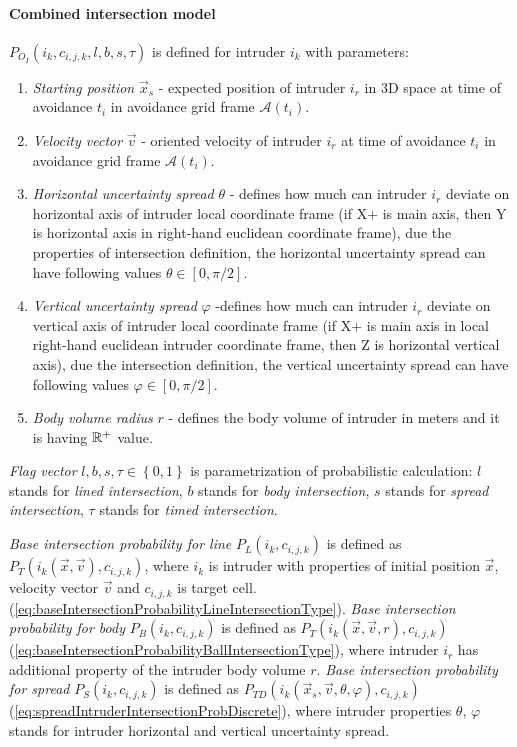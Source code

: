 \paragraph{Combined intersection model} $P_{O_I}(i_k,c_{i,j,k},l,b,s,\tau)$ is defined for intruder $i_k$ with parameters:
\begin{enumerate}
    \item\textit{Starting position} $\vec{x}_s$ - expected position of intruder $i_r$ in 3D space at time of avoidance $t_i$ in avoidance grid frame $\mathscr{A}(t_i)$.
    \item\textit{Velocity vector} $\vec{v}$ - oriented velocity of intruder $i_r$ at time of avoidance $t_i$ in avoidance grid frame $\mathscr{A}(t_i)$. 
    \item\textit{Horizontal uncertainty spread} $\theta$ - defines how much can intruder $i_r$ deviate on horizontal axis of intruder local coordinate frame (if X+ is main axis, then Y is horizontal axis in right-hand euclidean coordinate frame), due the properties of intersection definition, the horizontal uncertainty spread can have following values $\theta\in[0,\pi/2]$.
    \item\textit{Vertical uncertainty spread} $\varphi$ -defines how much can intruder $i_r$ deviate on vertical axis of intruder local coordinate frame (if X+ is main axis in local right-hand euclidean intruder coordinate frame, then Z is horizontal vertical axis), due the intersection definition, the vertical uncertainty spread can have following values $\varphi\in[0,\pi/2]$.
    \item\textit{Body volume radius} $r$ - defines the body volume of intruder in meters and it is having  $\mathbb{R}^+$  value.
\end{enumerate}
\noindent \emph{Flag vector} $l,b,s,\tau \in \left\{0,1\right\}$ is parametrization of probabilistic calculation: $l$ stands for \emph{lined intersection}, $b$ stands for \emph{body intersection}, $s$ stands for \emph{spread intersection}, $\tau$ stands for \emph{timed intersection}. 

\emph{Base intersection probability for line} $P_L(i_k,c_{i,j,k})$ is defined as $P_T(i_k(\vec{x},\vec{v}),c_{i,j,k})$, where $i_k$ is intruder with properties of initial position $\vec{x}$, velocity vector $\vec{v}$ and $c_{i,j,k}$ is target cell. (\ref{eq:baseIntersectionProbabilityLineIntersectionType}). \emph{Base intersection probability for body} $P_B(i_k,c_{i,j,k})$ is defined as $P_T(i_k(\vec{x},\vec{v},r),c_{i,j,k})$ (\ref{eq:baseIntersectionProbabilityBallIntersectionType}), where intruder $i_r$ has additional property of the intruder body volume $r$. \emph{Base intersection probability for spread} $P_S(i_k,c_{i,j,k})$ is defined as $P_{TD}(i_k(\vec{x}_s,\vec{v},\theta,\varphi),c_{i,j,k})$ (\ref{eq:spreadIntruderIntersectionProbDiscrete}), where intruder properties $\theta$, $\varphi$ stands for intruder horizontal and vertical uncertainty spread.

